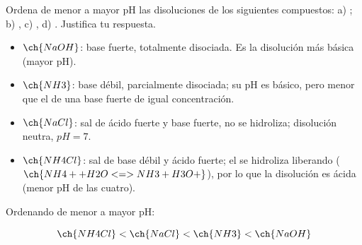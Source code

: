 \begin{exerciseEVAU}
    Ordena de menor a mayor pH las disoluciones   de los siguientes compuestos: a) ; b) , c) , d) . Justifica tu respuesta.


    \begin{solu}


        \begin{itemize}
            \item \(\ch{NaOH}\): base fuerte, totalmente disociada. Es la disolución más básica (mayor pH).
            \item \(\ch{NH3}\): base débil, parcialmente disociada; su pH es básico, pero menor que el de una base fuerte de igual concentración.
            \item \(\ch{NaCl}\): sal de ácido fuerte y base fuerte, no se hidroliza; disolución neutra, \(pH = 7\).
            \item \(\ch{NH4Cl}\): sal de base débil y ácido fuerte; el  se hidroliza liberando  (\(\ch{NH4+ + H2O <=> NH3 + H3O+}\)), por lo que la disolución es ácida (menor pH de las cuatro).
        \end{itemize}

        Ordenando de menor a mayor pH:

        \begin{equation*}
            \ch{NH4Cl} < \ch{NaCl} < \ch{NH3} < \ch{NaOH}
        \end{equation*}

    \end{solu}
\end{exerciseEVAU}
